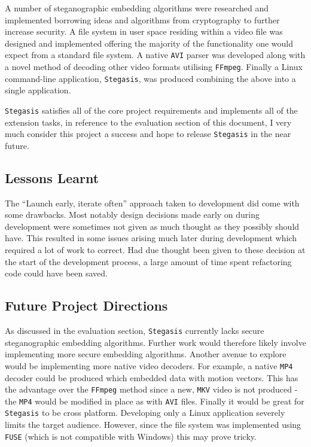 \documentclass[paper=a4, fontsize=11pt,twoside]{scrartcl}    %
\numberwithin{table}{section}
\numberwithin{figure}{section}
\numberwithin{algorithm}{section}
\begin{document}
A number of steganographic embedding algorithms were researched and implemented borrowing ideas and algorithms from cryptography to further increase security. A file system in user space residing within a video file was designed and implemented offering the majority of the functionality one would expect from a standard file system. A native \texttt{AVI} parser was developed along with a novel method of decoding other video formats utilising \texttt{FFmpeg}. Finally a Linux command-line application, \texttt{Stegasis}, was produced combining the above into a single application.

\texttt{Stegasis} satisfies all of the core project requirements and implements all of the extension tasks, in reference to the evaluation section of this document, I very much consider this project a success and hope to release \texttt{Stegasis} in the near future.

\subsection{Lessons Learnt}

The ``Launch early, iterate often'' approach taken to development did come with some drawbacks. Most notably design decisions made early on during development were sometimes not given as much thought as they possibly should have. This resulted in some issues arising much later during development which required a lot of work to correct. Had due thought been given to these decision at the start of the development process, a large amount of time spent refactoring code could have been saved. 

\subsection{Future Project Directions}

As discussed in the evaluation section, \texttt{Stegasis} currently lacks secure steganographic embedding algorithms. Further work would therefore likely involve implementing more secure embedding algorithms. Another avenue to explore would be implementing more native video decoders. For example, a native \texttt{MP4} decoder could be produced which embedded data with motion vectors. This has the advantage over the \texttt{FFmpeg} method since a new, \texttt{MKV} video is not produced - the \texttt{MP4} would be modified in place as with \texttt{AVI} files.
Finally it would be great for \texttt{Stegasis} to be cross platform. Developing only a Linux application severely limits the target audience. However, since the file system was implemented using \texttt{FUSE} (which is not compatible with Windows) this may prove tricky.
\end{document}
